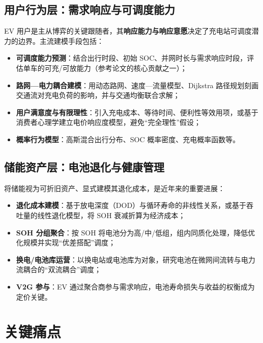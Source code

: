\documentclass[UTF8,a4paper,11pt]{ctexart}
\begin{document}
\subsection{用户行为层：需求响应与可调度能力}
EV 用户是主从博弈的关键跟随者，其\textbf{响应能力与响应意愿}决定了充电站可调度潜力的边界。主流建模手段包括：
\begin{itemize}
  \item \textbf{可调度能力预测}：结合出行时段、初始 SOC、并网时长与需求响应时段，评估单车的可充/可放能力（参考论文的核心贡献之一\cite{ref1}）；
  \item \textbf{路网—电力耦合建模}：用动态路网、速度—流量模型、Dijkstra 路径规划刻画交通流对充电负荷的影响，并与交通均衡联合求解\cite{ref4,ref14}；
  \item \textbf{用户满意度与有限理性}：引入充电成本、等待时间、便利性等效用项，或基于消费者心理学建立电价响应度模型，避免“完全理性”假设\cite{ref2,ref9}；
  \item \textbf{概率行为模型}：高斯混合出行分布、SOC 概率密度、充电概率函数等。
\end{itemize}

\subsection{储能资产层：电池退化与健康管理}
将储能视为可折旧资产、显式建模其退化成本，是近年来的重要进展：
\begin{itemize}
  \item \textbf{退化成本建模}：基于放电深度（DOD）与循环寿命的非线性关系，或基于吞吐量的线性退化模型，将 SOH 衰减折算为经济成本\cite{ref7,ref8,ref13}；
  \item \textbf{SOH 分组聚合}：按 SOH 将电池分为高/中/低组，组内同质化处理，降低优化规模并实现“优差搭配”调度；
  \item \textbf{换电/电池库运营}：以换电站或电池库为对象，研究电池在微网间流转与电力流耦合的“双流耦合”调度；
  \item \textbf{V2G 参与}：EV 通过聚合商参与需求响应，电池寿命损失与收益的权衡成为定价关键\cite{ref9}。
\end{itemize}

\section{关键痛点}
\end{document}
